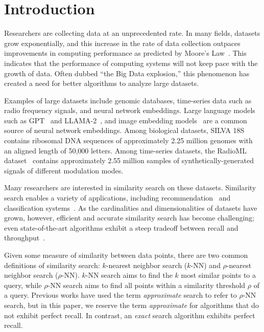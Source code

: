 \section{Introduction}
\label{sec:introduction}

Researchers are collecting data at an unprecedented rate.
In many fields, datasets grow exponentially, and this increase in the rate of data collection outpaces improvements in computing performance as predicted by Moore's Law~\cite{kahn2011future}.
This indicates that the performance of computing systems will not keep pace with the growth of data.
Often dubbed ``the Big Data explosion,'' this phenomenon has created a need for better algorithms to analyze large datasets.

Examples of large datasets include genomic databases, time-series data such as radio frequency signals, and neural network embeddings.
Large language models such as GPT~\cite{2020arXiv200514165B, OpenAI2023GPT4TR} and LLAMA-2~\cite{Touvron2023Llama2O}, and image embedding models~\cite{radford2021learning, dosovitskiy2020image} are a common source of neural network embeddings.
Among biological datasets,  SILVA 18S~\cite{10.1093/nar/gks1219} contains ribosomal DNA sequences of approximately 2.25 million genomes with an aligned length of 50,000 letters.
Among time-series datasets, the RadioML dataset~\cite{oshea2018radioml} contains approximately 2.55 million samples of synthetically-generated signals of different modulation modes.

Many researchers are interested in similarity search on these datasets.
Similarity search enables a variety of applications, including recommendation~\cite{annoy} and classification systems~\cite{suyanto2022knnclassifier}.
As the cardinalities and dimensionalities of datasets have grown, however, efficient and accurate similarity search has become challenging;
even state-of-the-art algorithms exhibit a steep tradeoff between recall and throughput~\cite{malkov2016hnsw, johnson2019billion, annoy, aumuller2020ann}.

Given some measure of similarity between data points, there are two common definitions of similarity search: $k$-nearest neighbor search ($k$-NN) and $\rho$-nearest neighbor search ($\rho$-NN).
$k$-NN search aims to find the $k$ most similar points to a query, while $\rho$-NN search aims to find all points within a similarity threshold $\rho$ of a query.
Previous works have used the term \textit{approximate} search to refer to $\rho$-NN search, but in this paper, we reserve the term \textit{approximate} for algorithms that do not exhibit perfect recall.
In contrast, an \textit{exact} search algorithm exhibits perfect recall.

